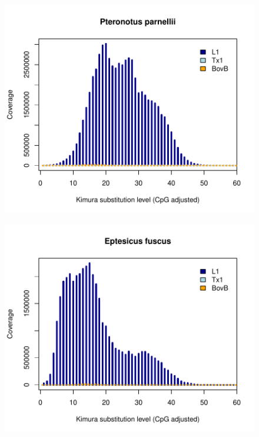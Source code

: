 \documentclass[12pt,a4paper,times]{article}
\begin{document}
\begin{figure}[H]
	\centering
	\includegraphics[scale=0.8]{suppFigures/divergencePlots/Pteronotus_parnellii.pdf}
	\caption{\label{Pteronotus_parnellii}}
\end{figure}

\begin{figure}[H]
	\centering
	\includegraphics[scale=0.8]{suppFigures/divergencePlots/Eptesicus_fuscus.pdf}
	\caption{\label{Eptesicus_fuscus}}
\end{figure}
\end{document}
